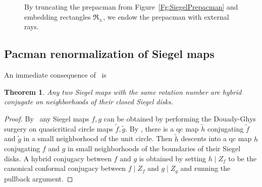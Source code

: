 \documentclass[]{amsart}
\newcommand{\Rect}{{\mathfrak R }}
\newtheorem{thm}{Theorem}[section]
\theoremstyle{remark}
\numberwithin{equation}{section}
\theoremstyle{definition}
\begin{document}
\begin{figure}[t!]
{}
\caption{By truncating the prepacman from Figure~\ref{Fg:SiegelPrepacman} and embedding rectangles $\Rect_\pm$, we endow the prepacman with external rays.
 }
\label{Fg:ConstrOfSiegPrepac Axil:part 2}
\end{figure}


\subsection{Pacman renormalization of Siegel maps}An immediate consequence of~\cite[Theorem 3.19, Proposition 4.3]{AL-posmeas} is 
\begin{thm}
\label{thm:HybrCongSiegMaps}
Any two Siegel maps with the same rotation number are hybrid conjugate on neighborhoods of their closed Siegel disks.
\end{thm}
\begin{proof} By~\cite[Proposition 4.3]{AL-posmeas} any Siegel maps $f,g$ can be obtained  by performing the Douady-Ghys surgery on quasicritical circle maps $\tilde f, \tilde g$. By \cite[Theorem 3.19]{AL-posmeas}, there is a qc map $\tilde h $ conjugating $\tilde f$ and $\tilde g$ in a small neighborhood of the unit circle. Then $\tilde h$ descents into a qc map $h$ conjugating $ f$ and $ g$ in small neighborhoods of the boundaries of their Siegel disks. A hybrid conjugacy between $f$ and $g$ is obtained by setting  $h\mid Z_f$ to be the canonical conformal conjugacy between $f\mid Z_f$ and $g\mid Z_g$ and running the pullback argument.
\end{proof}
\end{document}
